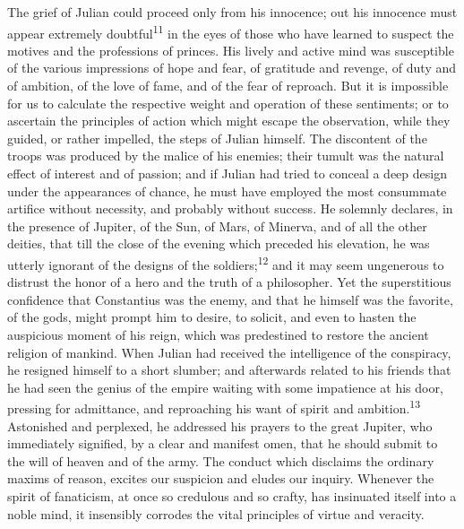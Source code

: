 
The grief of Julian could proceed only from his innocence; out
his innocence must appear extremely doubtful\textsuperscript{11} in the eyes of
those who have learned to suspect the motives and the professions
of princes. His lively and active mind was susceptible of the
various impressions of hope and fear, of gratitude and revenge,
of duty and of ambition, of the love of fame, and of the fear of
reproach. But it is impossible for us to calculate the respective
weight and operation of these sentiments; or to ascertain the
principles of action which might escape the observation, while
they guided, or rather impelled, the steps of Julian himself. The
discontent of the troops was produced by the malice of his
enemies; their tumult was the natural effect of interest and of
passion; and if Julian had tried to conceal a deep design under
the appearances of chance, he must have employed the most
consummate artifice without necessity, and probably without
success. He solemnly declares, in the presence of Jupiter, of the
Sun, of Mars, of Minerva, and of all the other deities, that till
the close of the evening which preceded his elevation, he was
utterly ignorant of the designs of the soldiers;\textsuperscript{12} and it may
seem ungenerous to distrust the honor of a hero and the truth of
a philosopher. Yet the superstitious confidence that Constantius
was the enemy, and that he himself was the favorite, of the gods,
might prompt him to desire, to solicit, and even to hasten the
auspicious moment of his reign, which was predestined to restore
the ancient religion of mankind. When Julian had received the
intelligence of the conspiracy, he resigned himself to a short
slumber; and afterwards related to his friends that he had seen
the genius of the empire waiting with some impatience at his
door, pressing for admittance, and reproaching his want of spirit
and ambition.\textsuperscript{13} Astonished and perplexed, he addressed his
prayers to the great Jupiter, who immediately signified, by a
clear and manifest omen, that he should submit to the will of
heaven and of the army. The conduct which disclaims the ordinary
maxims of reason, excites our suspicion and eludes our inquiry.
Whenever the spirit of fanaticism, at once so credulous and so
crafty, has insinuated itself into a noble mind, it insensibly
corrodes the vital principles of virtue and veracity.

